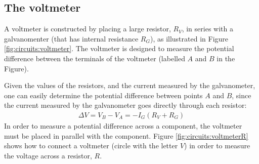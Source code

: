 \subsection{The voltmeter}
A voltmeter is constructed by placing a large resistor, $R_V$, in series with a galvanomenter (that has internal resistance $R_G$), as illustrated in Figure \ref{fig:circuits:voltmeter}. The voltmeter is designed to measure the potential difference between the terminals of the voltmeter (labelled $A$ and $B$ in the Figure).


Given the values of the resistors, and the current measured by the galvanometer, one can easily determine the potential difference between points $A$ and $B$, since the current measured by the galvanometer goes directly through each resistor:
\begin{align*}
\Delta V = V_B-V_A=-I_G(R_V+R_G)
\end{align*}
In order to measure a potential difference across a component, the voltmeter must be placed in parallel with the component. Figure \ref{fig:circuits:voltmeterR} shows how to connect a voltmeter (circle with the letter $V$) in order to measure the voltage across a resistor, $R$.


